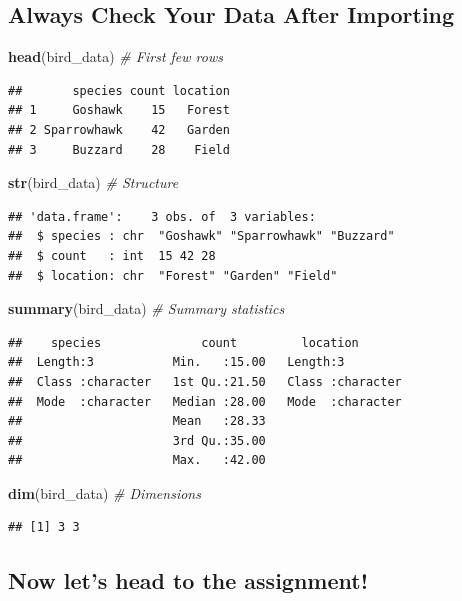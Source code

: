 \documentclass[
]{article}
\newenvironment{Shaded}{\begin{snugshade}}{\end{snugshade}}
\newcommand{\CommentTok}[1]{\textcolor[rgb]{0.56,0.35,0.01}{\textit{#1}}}
\newcommand{\FunctionTok}[1]{\textcolor[rgb]{0.13,0.29,0.53}{\textbf{#1}}}
\newcommand{\NormalTok}[1]{#1}
\begin{document}
\subsection{Always Check Your Data After
Importing}\label{always-check-your-data-after-importing}

\begin{Shaded}
\begin{Highlighting}[]
\FunctionTok{head}\NormalTok{(bird\_data)          }\CommentTok{\# First few rows}
\end{Highlighting}
\end{Shaded}

\begin{verbatim}
##       species count location
## 1     Goshawk    15   Forest
## 2 Sparrowhawk    42   Garden
## 3     Buzzard    28    Field
\end{verbatim}

\begin{Shaded}
\begin{Highlighting}[]
\FunctionTok{str}\NormalTok{(bird\_data)           }\CommentTok{\# Structure}
\end{Highlighting}
\end{Shaded}

\begin{verbatim}
## 'data.frame':    3 obs. of  3 variables:
##  $ species : chr  "Goshawk" "Sparrowhawk" "Buzzard"
##  $ count   : int  15 42 28
##  $ location: chr  "Forest" "Garden" "Field"
\end{verbatim}

\begin{Shaded}
\begin{Highlighting}[]
\FunctionTok{summary}\NormalTok{(bird\_data)       }\CommentTok{\# Summary statistics}
\end{Highlighting}
\end{Shaded}

\begin{verbatim}
##    species              count         location        
##  Length:3           Min.   :15.00   Length:3          
##  Class :character   1st Qu.:21.50   Class :character  
##  Mode  :character   Median :28.00   Mode  :character  
##                     Mean   :28.33                     
##                     3rd Qu.:35.00                     
##                     Max.   :42.00
\end{verbatim}

\begin{Shaded}
\begin{Highlighting}[]
\FunctionTok{dim}\NormalTok{(bird\_data)           }\CommentTok{\# Dimensions}
\end{Highlighting}
\end{Shaded}

\begin{verbatim}
## [1] 3 3
\end{verbatim}

\subsection{Now let's head to the
assignment!}\label{now-lets-head-to-the-assignment}
\end{document}
